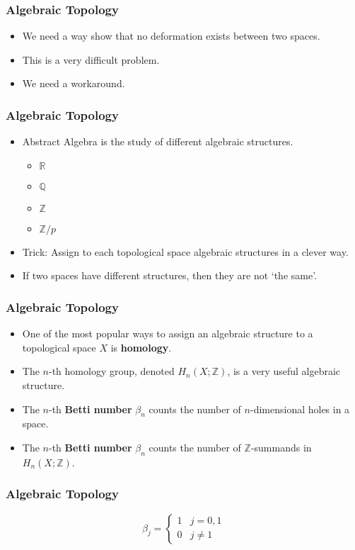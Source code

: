 \begin{frame}
\frametitle{Algebraic Topology}
\begin{itemize}
\item<1-> We need a way show that no deformation exists between two spaces.
\item<2-> This is a very difficult problem.
\item<3-> We need a workaround.
\end{itemize}
\end{frame}

\begin{frame}
\frametitle{Algebraic Topology}
\begin{itemize}
\item<1-> Abstract Algebra is the study of different {\color{red}algebraic structures}.
	\begin{itemize}
	\item<2-> $\mathbb{R}$
	\item<2-> $\mathbb{Q}$
	\item<2-> $\mathbb{Z}$
	\item<2-> $\mathbb{Z}/p$
	\end{itemize}
\item<3-> Trick: Assign to each topological space algebraic structures in a clever way. 
\item<4-> If two spaces have different structures, then they are not `the same'.
\end{itemize}
\end{frame}


\begin{frame}
\frametitle{Algebraic Topology}
\begin{itemize}
\item<1-> One of the most popular ways to assign an algebraic structure to a topological space $X$ is \textbf{homology}.
\item<2-> The $n$-th homology group, denoted $H_n(X; \mathbb{Z})$, is a very useful algebraic structure.
\item<3-> The $n$-th \textbf{Betti number} $\beta_n$ counts the number of $n$-dimensional holes in a space.
\item<4-> The $n$-th \textbf{Betti number} $\beta_n$ counts the number of $\mathbb{Z}$-summands in $H_n(X;\mathbb{Z})$.
\end{itemize}
\end{frame}

\begin{frame}
\frametitle{Algebraic Topology}
\[ \beta_j = \begin{cases} 
      	1 & j = 0, 1 \\
      	0 & j \neq 1 
   \end{cases}
\]
\end{frame}

